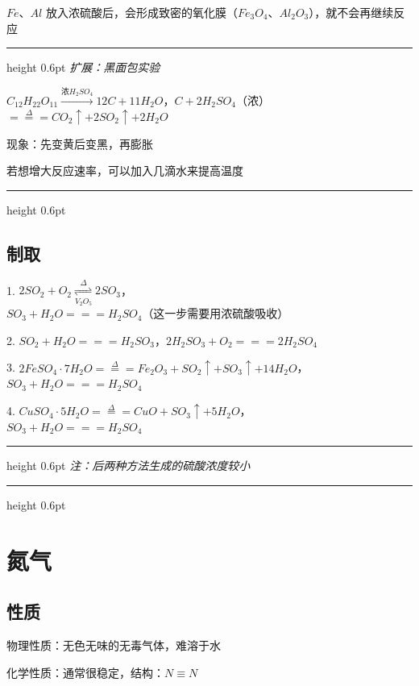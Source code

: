 \documentclass[UTF8,zihao=-4,openany]{ctexbook}
\providecommand{\xrightleftharpoons}[2][]{\mathrel{\mathop{\rightleftharpoons}\limits^{#2}_{#1}}}
\newenvironment{notebox}
  {\par\smallskip\noindent\begingroup\begin{minipage}{\linewidth}\color{noteframe}\hrule height 0.6pt\smallskip\color{black}\itshape}
  {\par\smallskip\color{noteframe}\hrule height 0.6pt\end{minipage}\endgroup\par\smallskip}
\begin{document}
$Fe$、$Al$ 放入浓硫酸后，会形成致密的氧化膜（$Fe_3O_4$、$Al_2O_3$），就不会再继续反应\par

\begin{notebox}
扩展：黑面包实验\par
$C_{12}H_{22}O_{11}\stackrel{\mbox{浓} H_2SO_4}{\longrightarrow}12C+11H_2O$，$C+2H_2SO_4$（浓）$\stackrel{\Delta}{=\!=\!=}CO_2\uparrow+2SO_2\uparrow+2H_2O$\par
现象：先变黄后变黑，再膨胀\par
若想增大反应速率，可以加入几滴水来提高温度\par
\end{notebox}
\subsection{制取}
1. $2SO_2+O_2\xrightleftharpoons[V_2O_5]{\Delta}2SO_3$，\\[0.25em]
\hspace*{2em}$SO_3+H_2O=\!=\!=H_2SO_4$（这一步需要用浓硫酸吸收）\par

2. $SO_2+H_2O=\!=\!=H_2SO_3$，$2H_2SO_3+O_2=\!=\!=2H_2SO_4$\par

3. $2FeSO_4\cdot 7H_2O\stackrel{\Delta}{=\!=\!=}Fe_2O_3+SO_2\uparrow+SO_3\uparrow+14H_2O$，\\[0.25em]
\hspace*{2em}$SO_3+H_2O=\!=\!=H_2SO_4$\par

4. $CuSO_4\cdot 5H_2O\stackrel{\Delta}{=\!=\!=}CuO+SO_3\uparrow+5H_2O$，\\[0.25em]
\hspace*{2em}$SO_3+H_2O=\!=\!=H_2SO_4$\par

\begin{notebox}
注：后两种方法生成的硫酸浓度较小\par
\end{notebox}
\section{氮气}
\subsection{性质}
物理性质：无色无味的无毒气体，难溶于水\par

化学性质：通常很稳定，结构：$N\equiv N$\par
\end{document}
